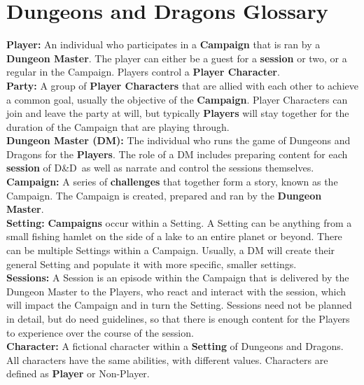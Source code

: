 \documentclass[progress]{cmpreport}
\newcommand{\dnd}{D\&D}
\begin{document}
	\clearpage
	
	\appendix
	\section{Dungeons and Dragons Glossary} \label{app:example}
	\textbf{Player:} An individual who participates in a \textbf{Campaign} that is ran by a \textbf{Dungeon Master}. The player can either be a guest for a \textbf{session} or two, or a regular in the Campaign. Players control a \textbf{Player Character}. \\
	
	\textbf{Party:} A group of \textbf{Player Characters} that are allied with each other to achieve a common goal, usually the objective of the \textbf{Campaign}. Player Characters can join and leave the party at will, but typically \textbf{Players} will stay together for the duration of the Campaign that are playing through. \\ 
	
	\textbf{Dungeon Master (DM):} The individual who runs the game of Dungeons and Dragons for the \textbf{Players}. The role of a DM includes preparing content for each \textbf{session} of \dnd \ as well as narrate and control the sessions themselves.\\
	
	\textbf{Campaign:} A series of \textbf{challenges} that together form a story, known as the Campaign. The Campaign is created, prepared and ran by the \textbf{Dungeon Master}.\\
	
	\textbf{Setting:} \textbf{Campaigns} occur within a Setting. A Setting can be anything from a small fishing hamlet on the side of a lake to an entire planet or beyond. There can be multiple Settings within a Campaign. Usually, a DM will create their general Setting and populate it with more specific, smaller settings.\\
	
	\textbf{Sessions:} A Session is an episode within the Campaign that is delivered by the Dungeon Master to the Players, who react and interact with the session, which will impact the Campaign and in turn the Setting. Sessions need not be planned in detail, but do need guidelines, so that there is enough content for the Players to experience over the course of the session. \\
	
	\textbf{Character:} A fictional character within a \textbf{Setting} of Dungeons and Dragons. All characters have the same abilities, with different values. Characters are defined as \textbf{Player} or Non-Player. \\
	
\end{document}

